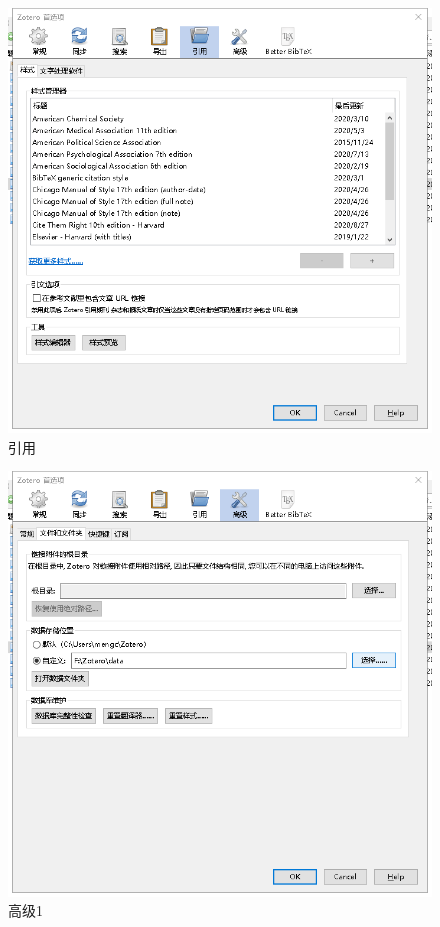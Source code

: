 \begin{figure}
	\centering
	\includegraphics[scale=0.8]{Fig/zotero6.png}
	\caption{\label{op6}引用}
\end{figure}
\begin{figure}
	\centering
	\includegraphics[scale=0.8]{Fig/zotero7.png}
	\caption{\label{op7}高级1}
\end{figure}
